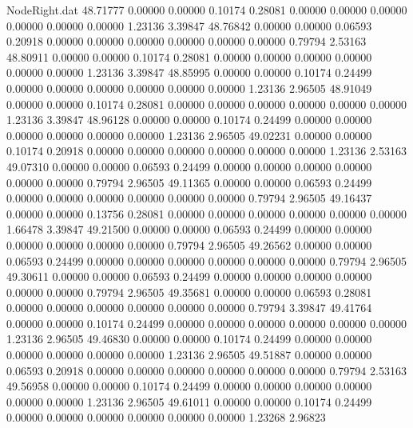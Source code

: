 \begin{filecontents}{NodeRight.dat}
  48.71777    0.00000    0.00000     0.10174    0.28081    0.00000    0.00000    0.00000    0.00000    0.00000    0.00000    1.23136    3.39847
  48.76842    0.00000    0.00000     0.06593    0.20918    0.00000    0.00000    0.00000    0.00000    0.00000    0.00000    0.79794    2.53163
  48.80911    0.00000    0.00000     0.10174    0.28081    0.00000    0.00000    0.00000    0.00000    0.00000    0.00000    1.23136    3.39847
  48.85995    0.00000    0.00000     0.10174    0.24499    0.00000    0.00000    0.00000    0.00000    0.00000    0.00000    1.23136    2.96505
  48.91049    0.00000    0.00000     0.10174    0.28081    0.00000    0.00000    0.00000    0.00000    0.00000    0.00000    1.23136    3.39847
  48.96128    0.00000    0.00000     0.10174    0.24499    0.00000    0.00000    0.00000    0.00000    0.00000    0.00000    1.23136    2.96505
  49.02231    0.00000    0.00000     0.10174    0.20918    0.00000    0.00000    0.00000    0.00000    0.00000    0.00000    1.23136    2.53163
  49.07310    0.00000    0.00000     0.06593    0.24499    0.00000    0.00000    0.00000    0.00000    0.00000    0.00000    0.79794    2.96505
  49.11365    0.00000    0.00000     0.06593    0.24499    0.00000    0.00000    0.00000    0.00000    0.00000    0.00000    0.79794    2.96505
  49.16437    0.00000    0.00000     0.13756    0.28081    0.00000    0.00000    0.00000    0.00000    0.00000    0.00000    1.66478    3.39847
  49.21500    0.00000    0.00000     0.06593    0.24499    0.00000    0.00000    0.00000    0.00000    0.00000    0.00000    0.79794    2.96505
  49.26562    0.00000    0.00000     0.06593    0.24499    0.00000    0.00000    0.00000    0.00000    0.00000    0.00000    0.79794    2.96505
  49.30611    0.00000    0.00000     0.06593    0.24499    0.00000    0.00000    0.00000    0.00000    0.00000    0.00000    0.79794    2.96505
  49.35681    0.00000    0.00000     0.06593    0.28081    0.00000    0.00000    0.00000    0.00000    0.00000    0.00000    0.79794    3.39847
  49.41764    0.00000    0.00000     0.10174    0.24499    0.00000    0.00000    0.00000    0.00000    0.00000    0.00000    1.23136    2.96505
  49.46830    0.00000    0.00000     0.10174    0.24499    0.00000    0.00000    0.00000    0.00000    0.00000    0.00000    1.23136    2.96505
  49.51887    0.00000    0.00000     0.06593    0.20918    0.00000    0.00000    0.00000    0.00000    0.00000    0.00000    0.79794    2.53163
  49.56958    0.00000    0.00000     0.10174    0.24499    0.00000    0.00000    0.00000    0.00000    0.00000    0.00000    1.23136    2.96505
  49.61011    0.00000    0.00000     0.10174    0.24499    0.00000    0.00000    0.00000    0.00000    0.00000    0.00000    1.23268    2.96823

\end{filecontents}
